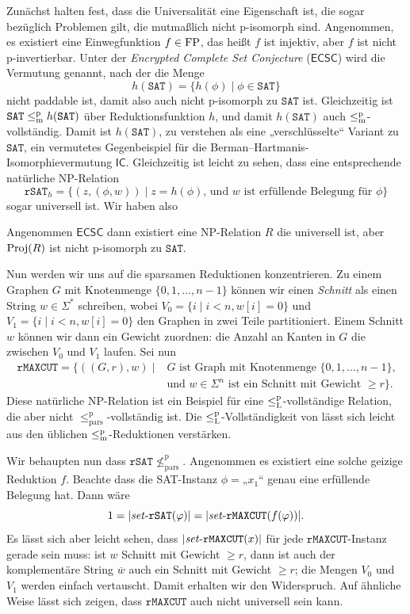 Zunächst halten \textcite{agrawal_universal_1992} fest, dass die Universalität eine Eigenschaft ist, die sogar bezüglich Problemen gilt, die mutmaßlich nicht p-isomorph sind.
Angenommen, es existiert eine Einwegfunktion $f\in\mathrm{FP}$, das heißt $f$ ist injektiv, aber $f$ ist nicht p-invertierbar.
Unter der \emph{Encrypted Complete Set Conjecture} ($\mathsf{ECSC}$) wird die Vermutung genannt, nach der die Menge
\[ h(\mathtt{SAT}) = \{ h(\phi) \mid \phi\in\mathtt{SAT} \} \]
nicht paddable ist, damit also auch nicht p-isomorph zu $\mathtt{SAT}$ ist.
Gleichzeitig ist $\mathtt{SAT}\leq_\mathrm{m}^\mathrm{p} h(\mathtt{SAT})$ über Reduktionsfunktion $h$, und damit $h(\mathtt{SAT})$ auch $\leq_\mathrm{m}^\mathrm{p}$-vollständig.
Damit ist $h(\mathtt{SAT})$, zu verstehen als eine „verschlüsselte“ Variant zu $\mathtt{SAT}$, ein vermutetes Gegenbeispiel für die Berman--Hartmanis-Isomorphievermutung $\mathsf{IC}$.
Gleichzeitig ist leicht zu sehen, dass eine entsprechende natürliche NP-Relation
\[ \mathtt{rSAT}_h = \{ (z, (\phi, w)) \mid \text{$z=h(\phi)$, und $w$ ist erfüllende Belegung für $\phi$} \} \]
sogar universell ist.
Wir haben also %
\begin{observation}
    Angenommen $\mathsf{ECSC}$ dann existiert eine NP-Relation $R$ die universell ist, aber $\operatorname{Proj}(R)$ ist nicht p-isomorph zu $\mathtt{SAT}$.
\end{observation}


Nun werden wir uns auf die sparsamen Reduktionen konzentrieren.
Zu einem Graphen $G$ mit Knotenmenge $\{0,1,\dots, n-1\}$ können wir einen \emph{Schnitt} als einen String $w\in\Sigma^*$ schreiben, wobei $V_0 = \{ i \mid i<n, w[i]=0\}$ und $V_1 = \{ i \mid i<n, w[i]=0\}$ den Graphen in zwei Teile partitioniert. Einem Schnitt $w$ können wir dann ein Gewicht zuordnen: die Anzahl an Kanten in $G$ die zwischen $V_0$ und $V_1$ laufen.
Sei nun
\[ \begin{split} \mathtt{rMAXCUT} = \{ ((G, r), w) \mid {}&\text{$G$ ist Graph mit Knotenmenge $\{0,1,\dots,n-1\}$,} \\ &\text{und $w\in\Sigma^n$ ist ein Schnitt mit Gewicht $\geq r$} \}.\end{split} \]
Diese natürliche NP-Relation ist ein Beispiel für eine $\leq_\mathrm{L}^\mathrm{p}$-vollständige Relation, die aber nicht $\leq_\mathrm{pars}^\mathrm p$-vollständig ist. Die $\leq_\mathrm{L}^\mathrm{p}$-Vollständigkeit von lässt sich leicht aus den üblichen $\leq_\mathrm{m}^\mathrm{p}$-Reduktionen verstärken.

Wir behaupten nun dass $\mathtt{rSAT} \not\leq_\mathrm{pars}^\mathrm p$. Angenommen es existiert eine solche geizige Reduktion $f$. Beachte dass die SAT-Instanz $\phi={}$„$x_1$“ genau eine erfüllende Belegung hat. Dann wäre
\[ 1=|\mathit{set}\text{-}{}\mathtt{rSAT}(\varphi)|=|\mathit{set}\text{-}{}\mathtt{rMAXCUT}(f(\varphi))|. \]
Es lässt sich aber leicht sehen, dass $|\mathit{set}\text{-}{}\mathtt{rMAXCUT}(x)|$ für jede $\mathtt{rMAXCUT}$-Instanz gerade sein muss: ist $w$ Schnitt mit Gewicht $\geq r$, dann ist auch der komplementäre String $\overline{w}$ auch ein Schnitt mit Gewicht $\geq r$; die Mengen $V_0$ und $V_1$ werden einfach vertauscht.
Damit erhalten wir den Widerspruch. Auf ähnliche Weise lässt sich zeigen, dass $\mathtt{rMAXCUT}$ auch nicht universell sein kann.

